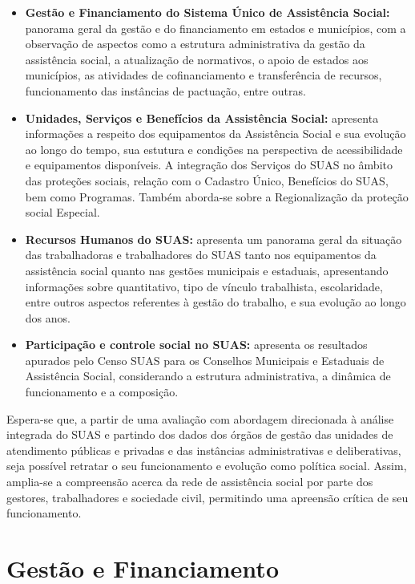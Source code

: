 \documentclass[
  brazilian]{report}
\begin{document}
\begin{itemize}
\item
  \textbf{Gestão e Financiamento do Sistema Único de Assistência
  Social:} panorama geral da gestão e do financiamento em estados e
  municípios, com a observação de aspectos como a estrutura
  administrativa da gestão da assistência social, a atualização de
  normativos, o apoio de estados aos municípios, as atividades de
  cofinanciamento e transferência de recursos, funcionamento das
  instâncias de pactuação, entre outras.
\item
  \textbf{Unidades, Serviços e Benefícios da Assistência Social:}
  apresenta informações a respeito dos equipamentos da Assistência
  Social e sua evolução ao longo do tempo, sua estutura e condições na
  perspectiva de acessibilidade e equipamentos disponíveis. A integração
  dos Serviços do SUAS no âmbito das proteções sociais, relação com o
  Cadastro Único, Benefícios do SUAS, bem como Programas. Também
  aborda-se sobre a Regionalização da proteção social Especial.
\item
  \textbf{Recursos Humanos do SUAS:} apresenta um panorama geral da
  situação das trabalhadoras e trabalhadores do SUAS tanto nos
  equipamentos da assistência social quanto nas gestões municipais e
  estaduais, apresentando informações sobre quantitativo, tipo de
  vínculo trabalhista, escolaridade, entre outros aspectos referentes à
  gestão do trabalho, e sua evolução ao longo dos anos.
\item
  \textbf{Participação e controle social no SUAS:} apresenta os
  resultados apurados pelo Censo SUAS para os Conselhos Municipais e
  Estaduais de Assistência Social, considerando a estrutura
  administrativa, a dinâmica de funcionamento e a composição.
\end{itemize}

Espera-se que, a partir de uma avaliação com abordagem direcionada à
análise integrada do SUAS e partindo dos dados dos órgãos de gestão das
unidades de atendimento públicas e privadas e das instâncias
administrativas e deliberativas, seja possível retratar o seu
funcionamento e evolução como política social. Assim, amplia-se a
compreensão acerca da rede de assistência social por parte dos gestores,
trabalhadores e sociedade civil, permitindo uma apreensão crítica de seu
funcionamento.

\hypertarget{gestuxe3o-e-financiamento}{%
\chapter{Gestão e Financiamento}\label{gestuxe3o-e-financiamento}}
\end{document}
